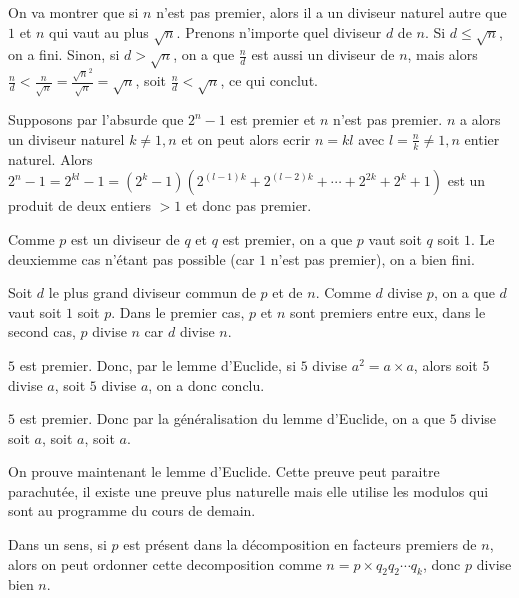 \sol

On va montrer que si \(n\) n'est pas premier, alors il a un diviseur naturel autre que \(1\) et \(n\) qui vaut au plus \(\sqrt{n}\). Prenons n'importe quel diviseur \(d\) de \(n\). Si \(d \leqslant \sqrt{n}\), on a fini. Sinon, si \(d > \sqrt{n}\), on a que \(\frac{n}{d}\) est aussi un diviseur de \(n\), mais alors \(\frac{n}{d} < \frac{n}{{\sqrt{n}}} = \frac{{\sqrt{n}}^2}{{\sqrt{n}}} = \sqrt{n}\), soit \(\frac{n}{d} < \sqrt{n}\), ce qui conclut.

\sol

Supposons par l'absurde que \(2^{n} - 1\) est premier et \(n\) n'est pas premier. \(n\) a alors un diviseur naturel \(k\not=1, n\) et on peut alors ecrir \(n = kl\) avec \(l = \frac{n}{k} \not= 1, n\) entier naturel. Alors \(2^{n} - 1 = 2^{kl} - 1 = \left(2^{k} - 1\right)\left(2^{\left(l-1\right)k} + 2^{\left(l-2\right)k} + \cdots + 2^{2k} + 2^{k} + 1\right)\) est un produit de deux entiers \(>1\) et donc pas premier.

\sol

Comme \(p\) est un diviseur de \(q\) et \(q\) est premier, on a que \(p\) vaut soit \(q\) soit \(1\). Le deuxiemme cas n'étant pas possible (car \(1\) n'est pas premier), on a bien fini.

\sol

Soit \(d\) le plus grand diviseur commun de \(p\) et de \(n\). Comme \(d\) divise \(p\), on a que \(d\) vaut soit \(1\) soit \(p\). Dans le premier cas, \(p\) et \(n\) sont premiers entre eux, dans le second cas, \(p\) divise \(n\) car \(d\) divise \(n\).

\sol

\(5\) est premier. Donc, par le lemme d'Euclide, si \(5\) divise \(a^2 = a \times a\), alors soit \(5\) divise \(a\), soit \(5\) divise \(a\), on a donc conclu.

\sol

\(5\) est premier. Donc par la généralisation du lemme d'Euclide, on a que \(5\) divise soit \(a\), soit \(a\), soit \(a\).

On prouve maintenant le lemme d'Euclide. Cette preuve peut paraitre parachutée, il existe une preuve plus naturelle mais elle utilise les modulos qui sont au programme du cours de demain.

\sol

Dans un sens, si \(p\) est présent dans la décomposition en facteurs premiers de \(n\), alors on peut ordonner cette decomposition comme \(n = p \times q_2 q_2 \cdots q_{k}\), donc \(p\) divise bien \(n\).

